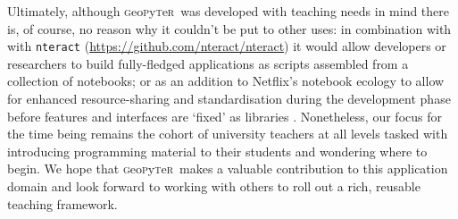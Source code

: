 \documentclass[letter, 11pt,titlepage]{article}
\newcommand{\gp}{\textsc{g}eo\textsc{p}y\textsc{t}e\textsc{r}~\/}
\begin{document}
Ultimately, although \gp was developed with teaching needs in mind there is, of course, no reason why it couldn't be put to other uses: in combination with with \texttt{nteract} (\url{https://github.com/nteract/nteract}) it would allow developers or researchers to build fully-fledged applications as scripts assembled from a collection of notebooks; or as an addition to Netflix's notebook ecology to allow for enhanced resource-sharing and standardisation during the development phase before features and interfaces are `fixed' as libraries \citep{Ufford2018}. Nonetheless, our focus for the time being remains the cohort of university teachers at all levels tasked with introducing programming material to their students and wondering where to begin. We hope that \gp makes a valuable contribution to this application domain and look forward to working with others to roll out a rich, reusable teaching framework.



\end{document}
